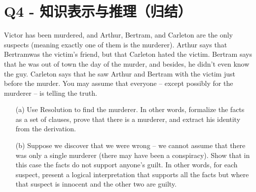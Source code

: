 \documentclass[a4paper, 11pt]{article}
\begin{document}
\newpage
\section{Q4 - 知识表示与推理（归结）}
\begin{question}\normalfont
    Victor has been murdered, and Arthur, Bertram, and Carleton are the only suspects (meaning exactly one of them is the murderer). Arthur says that Bertramwas the victim's friend, but that Carleton hated the victim. Bertram says that he was out of town the day of the murder, and besides, he didn't even know the guy. Carleton says that he saw Arthur and Bertram with the victim just before the murder. You may assume that everyone – except possibly for the murderer – is telling the truth.
    \begin{itemize}
    \item [(a)] Use Resolution to find the murderer. In other words, formalize the facts as a set of clauses, prove that there is a murderer, and extract his identity from the derivation.
    \item [(b)] Suppose we discover that we were wrong – we cannot assume that there was only a single murderer (there may have been a conspiracy). Show that in this case the facts do not support anyone's guilt. In other words, for each suspect, present a logical interpretation that supports all the facts but where that suspect is innocent and the other two are guilty.
    \end{itemize}
\end{question}
\end{document}

